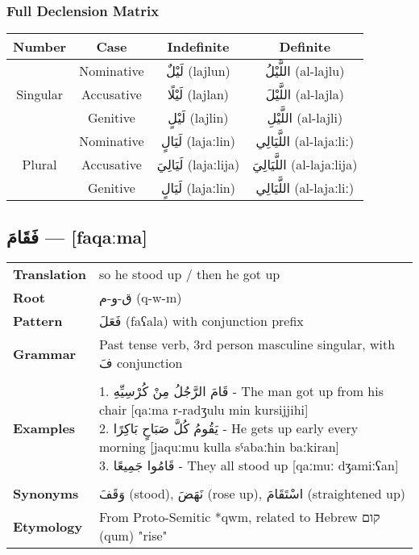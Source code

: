 \documentclass[letterpaper,12pt]{article}
\begin{document}
\subsubsection*{Full Declension Matrix}
\begin{tabular}{|c|c|c|c|}
\hline
\textbf{Number} & \textbf{Case} & \textbf{Indefinite} & \textbf{Definite} \\
\hline
\multirow{3}{*}{Singular}
 & Nominative   & \textarabic{لَيْلٌ} (lajlun) & \textarabic{اللَّيْلُ} (al-lajlu) \\
 & Accusative   & \textarabic{لَيْلًا} (lajlan) & \textarabic{اللَّيْلَ} (al-lajla) \\
 & Genitive     & \textarabic{لَيْلٍ} (lajlin) & \textarabic{اللَّيْلِ} (al-lajli) \\
\hline
\multirow{3}{*}{Plural}
 & Nominative   & \textarabic{لَيَالٍ} (lajaːlin) & \textarabic{اللَّيَالِي} (al-lajaːliː) \\
 & Accusative   & \textarabic{لَيَالِيَ} (lajaːlija) & \textarabic{اللَّيَالِيَ} (al-lajaːlija) \\
 & Genitive     & \textarabic{لَيَالٍ} (lajaːlin) & \textarabic{اللَّيَالِي} (al-lajaːliː) \\
\hline
\end{tabular}

\subsection{\textarabic{فَقَامَ} — [faqaːma]}
\begin{tabular}{p{3cm}p{10cm}}
\toprule
\textbf{Translation} & so he stood up / then he got up \\
\textbf{Root} & \textarabic{ق-و-م} (q-w-m) \\
\textbf{Pattern} & \textarabic{فَعَلَ} (faʕala) with conjunction prefix \\
\textbf{Grammar} & Past tense verb, 3rd person masculine singular, with \textarabic{فَ} conjunction \\
\midrule \\
\textbf{Examples} & \makecell[l]{\parbox{9.5cm}{
1. \textarabic{قَامَ الرَّجُلُ مِنْ كُرْسِيِّهِ} - The man got up from his chair [qaːma r-radʒulu min kursijjihi]\\
2. \textarabic{يَقُومُ كُلَّ صَبَاحٍ بَاكِرًا} - He gets up early every morning [jaquːmu kulla sˤabaːħin baːkiran]\\
3. \textarabic{قَامُوا جَمِيعًا} - They all stood up [qaːmuː dʒamiːʕan]
}} \\
\midrule \\
\textbf{Synonyms} & \textarabic{وَقَفَ} (stood), \textarabic{نَهَضَ} (rose up), \textarabic{اسْتَقَامَ} (straightened up) \\
\textbf{Etymology} & From Proto-Semitic *qwm, related to Hebrew \texthebrew{קום} (qum) "rise" \\
\bottomrule
\end{tabular}
\end{document}
